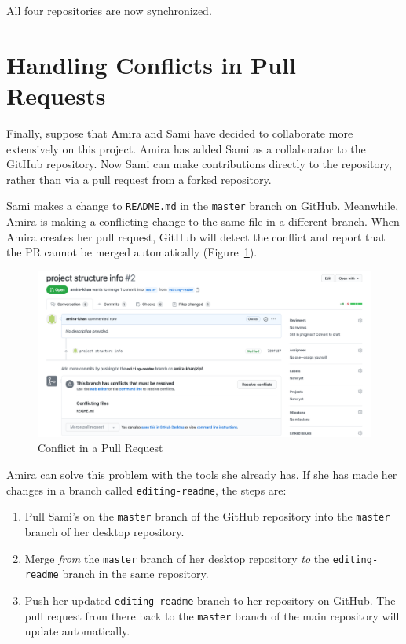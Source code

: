 \documentclass[
]{krantz}
\begin{document}
All four repositories are now synchronized.

\hypertarget{git-advanced-pr-conflict}{%
\section{Handling Conflicts in Pull Requests}\label{git-advanced-pr-conflict}}

Finally,
suppose that Amira and Sami have decided to collaborate more extensively on this project.
Amira has added Sami as a collaborator to the GitHub repository.
Now Sami can make contributions directly to the repository,
rather than via a pull request from a forked repository.

Sami makes a change to \texttt{README.md} in the \texttt{master} branch on GitHub.
Meanwhile, Amira is making a conflicting change to the same file in a different branch.
When Amira creates her pull request,
GitHub will detect the conflict and report that the PR cannot be merged automatically
(Figure~\ref{fig:git-advanced-pr-conflict}).

\begin{figure}

{\centering \includegraphics[width=1\linewidth]{figures/git-advanced/pr-conflict} 

}

\caption{Conflict in a Pull Request}\label{fig:git-advanced-pr-conflict}
\end{figure}

Amira can solve this problem with the tools she already has.
If she has made her changes in a branch called \texttt{editing-readme},
the steps are:

\begin{enumerate}
\def\labelenumi{\arabic{enumi}.}
\item
  Pull Sami's on the \texttt{master} branch of the GitHub repository
  into the \texttt{master} branch of her desktop repository.
\item
  Merge \emph{from} the \texttt{master} branch of her desktop repository
  \emph{to} the \texttt{editing-readme} branch in the same repository.
\item
  Push her updated \texttt{editing-readme} branch to her repository on GitHub.
  The pull request from there back to the \texttt{master} branch of the main repository
  will update automatically.
\end{enumerate}
\end{document}
